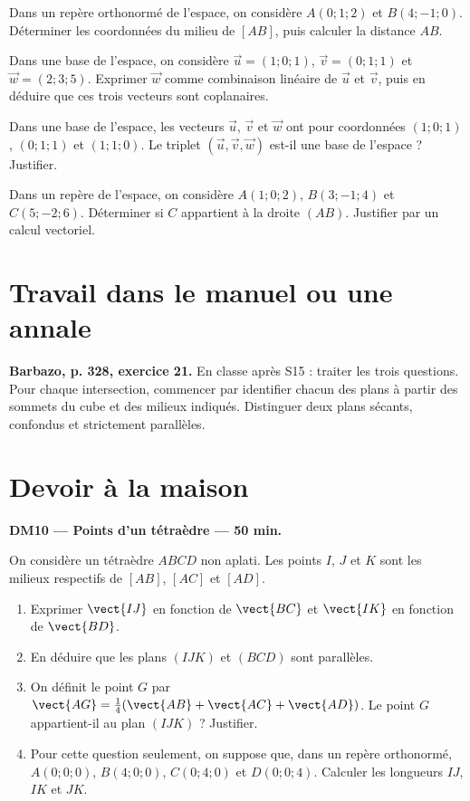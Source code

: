 Dans un repère orthonormé de l'espace, on considère $A(0;1;2)$ et $B(4;-1;0)$. Déterminer les coordonnées du milieu de $[AB]$, puis calculer la distance $AB$.

Dans une base de l'espace, on considère $\vec u=(1;0;1)$, $\vec v=(0;1;1)$ et $\vec w=(2;3;5)$. Exprimer $\vec w$ comme combinaison linéaire de $\vec u$ et $\vec v$, puis en déduire que ces trois vecteurs sont coplanaires.

Dans une base de l'espace, les vecteurs $\vec u$, $\vec v$ et $\vec w$ ont pour coordonnées $(1;0;1)$, $(0;1;1)$ et $(1;1;0)$. Le triplet $(\vec u,\vec v,\vec w)$ est-il une base de l'espace ? Justifier.

Dans un repère de l'espace, on considère $A(1;0;2)$, $B(3;-1;4)$ et $C(5;-2;6)$. Déterminer si $C$ appartient à la droite $(AB)$. Justifier par un calcul vectoriel.

\section{Travail dans le manuel ou une annale}\textbf{Barbazo, p. 328, exercice 21.} En classe après S15 : traiter les trois questions. Pour chaque intersection, commencer par identifier chacun des plans à partir des sommets du cube et des milieux indiqués. Distinguer deux plans sécants, confondus et strictement parallèles.

\section{Devoir à la maison}\textbf{DM10 --- Points d'un tétraèdre --- 50 min.}\par On considère un tétraèdre $ABCD$ non aplati. Les points $I$, $J$ et $K$ sont les milieux respectifs de $[AB]$, $[AC]$ et $[AD]$.
\begin{enumerate}\item Exprimer $\vect{IJ}$ en fonction de $\vect{BC}$ et $\vect{IK}$ en fonction de $\vect{BD}$.
\item En déduire que les plans $(IJK)$ et $(BCD)$ sont parallèles.
\item On définit le point $G$ par $\vect{AG}=\frac14(\vect{AB}+\vect{AC}+\vect{AD})$. Le point $G$ appartient-il au plan $(IJK)$ ? Justifier.
\item Pour cette question seulement, on suppose que, dans un repère orthonormé, $A(0;0;0)$, $B(4;0;0)$, $C(0;4;0)$ et $D(0;0;4)$. Calculer les longueurs $IJ$, $IK$ et $JK$.\end{enumerate}

